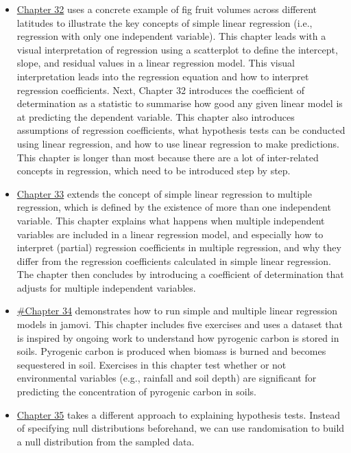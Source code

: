 \documentclass[
  openany]{scrbook}
\begin{document}
\begin{itemize}
\item
  \protect\hyperlink{Chapter_32}{Chapter 32} uses a concrete example of fig fruit volumes across different latitudes to illustrate the key concepts of simple linear regression (i.e., regression with only one independent variable).
  This chapter leads with a visual interpretation of regression using a scatterplot to define the intercept, slope, and residual values in a linear regression model.
  This visual interpretation leads into the regression equation and how to interpret regression coefficients.
  Next, Chapter 32 introduces the coefficient of determination as a statistic to summarise how good any given linear model is at predicting the dependent variable.
  This chapter also introduces assumptions of regression coefficients, what hypothesis tests can be conducted using linear regression, and how to use linear regression to make predictions.
  This chapter is longer than most because there are a lot of inter-related concepts in regression, which need to be introduced step by step.
\item
  \protect\hyperlink{Chapter_33}{Chapter 33} extends the concept of simple linear regression to multiple regression, which is defined by the existence of more than one independent variable.
  This chapter explains what happens when multiple independent variables are included in a linear regression model, and especially how to interpret (partial) regression coefficients in multiple regression, and why they differ from the regression coefficients calculated in simple linear regression.
  The chapter then concludes by introducing a coefficient of determination that adjusts for multiple independent variables.
\item
  \protect\hyperlink{Chapter_34}{\#Chapter 34} demonstrates how to run simple and multiple linear regression models in jamovi.
  This chapter includes five exercises and uses a dataset that is inspired by ongoing work to understand how pyrogenic carbon is stored in soils.
  Pyrogenic carbon is produced when biomass is burned and becomes sequestered in soil.
  Exercises in this chapter test whether or not environmental variables (e.g., rainfall and soil depth) are significant for predicting the concentration of pyrogenic carbon in soils.
\item
  \protect\hyperlink{Chapter_35}{Chapter 35} takes a different approach to explaining hypothesis tests.
  Instead of specifying null distributions beforehand, we can use randomisation to build a null distribution from the sampled data.

\end{itemize}
\end{document}
